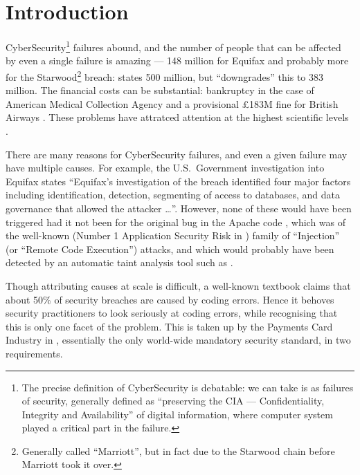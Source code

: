 \documentclass{eptcs}
\begin{document}
\section{Introduction}
CyberSecurity\footnote{The precise definition of CyberSecurity is debatable: we can take is as failures of security, generally defined as ``preserving the CIA --- Confidentiality, Integrity and Availability'' of digital information, where computer system played a critical part in the failure.} failures abound, and the number of people that can be affected by even a single failure is amazing --- 148 million for Equifax \cite{Bloomberg2018b} and probably more for the Starwood\footnote{Generally called ``Marriott'', but in fact due to the Starwood chain before Marriott took it over.} breach: \cite{BBC2018o} states 500 million, but \cite{Irwin2019b} ``downgrades'' this to 383 million.  The financial costs can be substantial: bankruptcy in the case of American Medical Collection Agency \cite{Ford2019b} and a provisional \pounds183M fine for British Airways \cite{Guardian2019i}.  These problems have attratced attention at the highest scientific levels \cite{RoyalSociety2016a}.
\par
There are many reasons for CyberSecurity failures, and even a given failure may have multiple causes. For example, the U.S.~Government investigation \cite{GAO2018a} into Equifax states ``Equifax's investigation of the breach identified four major factors
including identification, detection, segmenting of access to databases, and data
governance that allowed the attacker \dots''.  However, none of these would have been triggered had it not been for the original bug in the Apache code \cite{Lenart2017a}, which was of the well-known (Number 1 Application Security Risk in \cite{OWASP2017a})  family of ``Injection'' (or ``Remote Code Execution'') attacks, and which would probably have been detected by an automatic taint analysis tool such as \cite{LivshitsLam2005}.
\par
Though attributing causes at scale is difficult, a well-known textbook \cite{McGraw2006} claims that about 50\% of security breaches are caused by coding errors. Hence it behoves security practitioners to look seriously at coding errors, while recognising that this is only one facet of the problem. This is taken up by the Payments Card Industry in \cite{PCI2018b}, essentially the only world-wide mandatory security standard, in two requirements.
\end{document}
